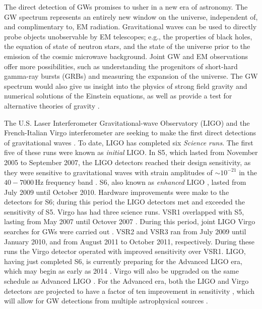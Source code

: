 The direct detection of \acp{GW} promises to usher in a new era of astronomy.
The \ac{GW} spectrum represents an entirely new window on the universe,
independent of, and complimentary to, \ac{EM} radiation. Gravitational waves
can be used to directly probe objects unobservable by EM telescopes; e.g., the
properties of black holes, the equation of state of neutron stars, and the
state of the universe prior to the emission of the cosmic microwave background.
Joint GW and EM observations offer more possibilities, such as understanding
the progenitors of short-hard gamma-ray bursts (GRBs) and measuring the
expansion of the universe. The GW spectrum would also give us insight into the
physics of strong field gravity and numerical solutions of the Einstein
equations, as well as provide a test for alternative theories of gravity
\cite{SathyaSchutz:livingReveiw:2009}.

The U.S. Laser Interferometer Gravitational-wave Observatory (LIGO) and the
French-Italian Virgo interferometer are seeking to make the first direct
detections of gravitational waves \cite{Abbott:2007kv}.  To date, \ac{LIGO} has
completed six \emph{Science runs}. The first five of these runs were known as
\emph{initial} \ac{LIGO}. In \ac{S5}, which lasted from November 2005 to
September 2007, the \ac{LIGO} detectors reached their design sensitivity, as
they were sensitive to gravitational waves with strain amplitudes of
$\sim10^{-21}$ in the $40-7000\,$Hz frequency band \cite{Abbott:2007kv}.
\ac{S6}, also known as \emph{enhanced} \ac{LIGO} \cite{Adhikari:2006}, lasted
from July 2009 until October 2010. Hardware improvements were make to the
detectors for \ac{S6}; during this period the \ac{LIGO} detectors met and
exceeded the sensitivity of \ac{S5}. Virgo has had three science runs.
\ac{VSR1} overlapped with \ac{S5}, lasting from May 2007 until Octover 2007
\cite{Acernese:2008zzf}. During this period, joint \ac{LIGO} Virgo searches for
\acp{GW} were carried out \cite{S5VSR1Burst, S5LowMassLV,
Collaboration:2009kk}. \ac{VSR2} and \ac{VSR3} ran from July 2009 until January
2010, and from August 2011 to October 2011, respectively. During these runs the
Virgo detector operated with improved sensitivity over \ac{VSR1}. \ac{LIGO},
having just completed \ac{S6}, is currently preparing for the Advanced
\ac{LIGO} era, which may begin as early as 2014 \cite{Harry:2010zz}. Virgo will
also be upgraded on the same schedule as Advanced \ac{LIGO}
\cite{Acernese:2008zzf}. For the Advanced era, both the \ac{LIGO} and Virgo
detectors are projected to have a factor of ten improvement in sensitivity
\cite{Harry:2010zz, PSD:AV}, which will allow for \ac{GW} detections from
multiple astrophysical sources \cite{Harry:2010zz, ratesdoc}.

